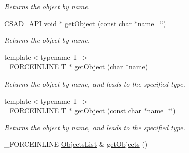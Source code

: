 \begin{DoxyCompactItemize}
\begin{DoxyCompactList}\small\item\em Returns the object by name. \end{DoxyCompactList}\item 
\hypertarget{classcsad_1_1_object_manager_abab7b19acea4a580eb1b7e93de934e61}{C\-S\-A\-D\-\_\-\-A\-P\-I void $\ast$ \hyperlink{classcsad_1_1_object_manager_abab7b19acea4a580eb1b7e93de934e61}{get\-Object} (const char $\ast$name=\char`\"{}\char`\"{})}\label{classcsad_1_1_object_manager_abab7b19acea4a580eb1b7e93de934e61}

\begin{DoxyCompactList}\small\item\em Returns the object by name. \end{DoxyCompactList}\item 
\hypertarget{classcsad_1_1_object_manager_a582611819f43c8304394b1c6ec871241}{{\footnotesize template$<$typename T $>$ }\\\-\_\-\-F\-O\-R\-C\-E\-I\-N\-L\-I\-N\-E T $\ast$ \hyperlink{classcsad_1_1_object_manager_a582611819f43c8304394b1c6ec871241}{get\-Object} (char $\ast$name)}\label{classcsad_1_1_object_manager_a582611819f43c8304394b1c6ec871241}

\begin{DoxyCompactList}\small\item\em Returns the object by name, and leads to the specified type. \end{DoxyCompactList}\item 
\hypertarget{classcsad_1_1_object_manager_a248074aa1e25c0c64acc9b9bcd53b5bc}{{\footnotesize template$<$typename T $>$ }\\\-\_\-\-F\-O\-R\-C\-E\-I\-N\-L\-I\-N\-E T $\ast$ \hyperlink{classcsad_1_1_object_manager_a248074aa1e25c0c64acc9b9bcd53b5bc}{get\-Object} (const char $\ast$name=\char`\"{}\char`\"{})}\label{classcsad_1_1_object_manager_a248074aa1e25c0c64acc9b9bcd53b5bc}

\begin{DoxyCompactList}\small\item\em Returns the object by name, and leads to the specified type. \end{DoxyCompactList}\item 
\hypertarget{classcsad_1_1_object_manager_a1ecc9faccf025a2b55c189fad21f4d48}{\-\_\-\-F\-O\-R\-C\-E\-I\-N\-L\-I\-N\-E \hyperlink{classbt_1_1_map_name}{Objects\-List} \& \hyperlink{classcsad_1_1_object_manager_a1ecc9faccf025a2b55c189fad21f4d48}{get\-Objects} ()}\label{classcsad_1_1_object_manager_a1ecc9faccf025a2b55c189fad21f4d48}


\end{DoxyCompactItemize}
